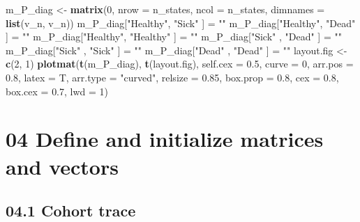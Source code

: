 \documentclass[]{article}
\newenvironment{Shaded}{\begin{snugshade}}{\end{snugshade}}
\newcommand{\KeywordTok}[1]{\textcolor[rgb]{0.13,0.29,0.53}{\textbf{#1}}}
\newcommand{\DataTypeTok}[1]{\textcolor[rgb]{0.13,0.29,0.53}{#1}}
\newcommand{\DecValTok}[1]{\textcolor[rgb]{0.00,0.00,0.81}{#1}}
\newcommand{\FloatTok}[1]{\textcolor[rgb]{0.00,0.00,0.81}{#1}}
\newcommand{\StringTok}[1]{\textcolor[rgb]{0.31,0.60,0.02}{#1}}
\newcommand{\NormalTok}[1]{#1}
\begin{document}
\begin{Shaded}
\begin{Highlighting}[]
\NormalTok{m_P_diag <-}\StringTok{ }\KeywordTok{matrix}\NormalTok{(}\DecValTok{0}\NormalTok{, }\DataTypeTok{nrow =}\NormalTok{ n_states, }\DataTypeTok{ncol =}\NormalTok{ n_states, }\DataTypeTok{dimnames =} \KeywordTok{list}\NormalTok{(v_n, v_n))}
\NormalTok{m_P_diag[}\StringTok{"Healthy"}\NormalTok{, }\StringTok{"Sick"}\NormalTok{ ]     =}\StringTok{ ""} 
\NormalTok{m_P_diag[}\StringTok{"Healthy"}\NormalTok{, }\StringTok{"Dead"}\NormalTok{ ]     =}\StringTok{ ""}
\NormalTok{m_P_diag[}\StringTok{"Healthy"}\NormalTok{, }\StringTok{"Healthy"}\NormalTok{ ]  =}\StringTok{ ""}
\NormalTok{m_P_diag[}\StringTok{"Sick"}\NormalTok{   , }\StringTok{"Dead"}\NormalTok{ ]     =}\StringTok{ ""}
\NormalTok{m_P_diag[}\StringTok{"Sick"}\NormalTok{   , }\StringTok{"Sick"}\NormalTok{ ]     =}\StringTok{ ""}
\NormalTok{m_P_diag[}\StringTok{"Dead"}\NormalTok{   , }\StringTok{"Dead"}\NormalTok{ ]     =}\StringTok{ ""}
\NormalTok{layout.fig <-}\StringTok{ }\KeywordTok{c}\NormalTok{(}\DecValTok{2}\NormalTok{, }\DecValTok{1}\NormalTok{)}
\KeywordTok{plotmat}\NormalTok{(}\KeywordTok{t}\NormalTok{(m_P_diag), }\KeywordTok{t}\NormalTok{(layout.fig), }\DataTypeTok{self.cex =} \FloatTok{0.5}\NormalTok{, }\DataTypeTok{curve =} \DecValTok{0}\NormalTok{, }\DataTypeTok{arr.pos =} \FloatTok{0.8}\NormalTok{,  }
        \DataTypeTok{latex =}\NormalTok{ T, }\DataTypeTok{arr.type =} \StringTok{"curved"}\NormalTok{, }\DataTypeTok{relsize =} \FloatTok{0.85}\NormalTok{, }\DataTypeTok{box.prop =} \FloatTok{0.8}\NormalTok{, }
        \DataTypeTok{cex =} \FloatTok{0.8}\NormalTok{, }\DataTypeTok{box.cex =} \FloatTok{0.7}\NormalTok{, }\DataTypeTok{lwd =} \DecValTok{1}\NormalTok{)}
\end{Highlighting}
\end{Shaded}

\section{04 Define and initialize matrices and
vectors}\label{define-and-initialize-matrices-and-vectors}

\subsection{04.1 Cohort trace}\label{cohort-trace}
\end{document}
